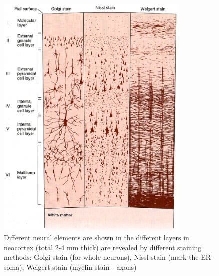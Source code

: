 \begin{figure}[hbtp]
  \centerline{\includegraphics[height=12cm,
    angle=0]{./images/laminal_cerebrum.eps}}
  \caption{Different neural elements are shown in the different layers in neocortex (total
  2-4 mm thick) are revealed by different staining methods: Golgi stain
  (for whole neurons), Nissl stain (mark the ER - soma), Weigert stain (myelin
  stain - axons)
    }
\label{fig:laminal}
\end{figure}

